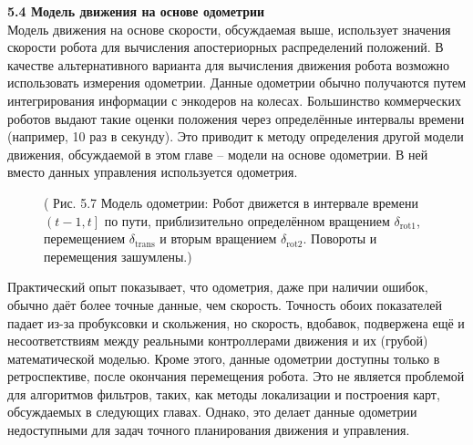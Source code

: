 \documentclass[10pt,a4paper]{article}
\begin{document}
\textbf{5.4 Модель движения на основе одометрии}\\

Модель движения на основе скорости, обсуждаемая выше, использует значения скорости робота для вычисления апостериорных распределений положений. В качестве альтернативного варианта для вычисления движения робота возможно использовать измерения одометрии. Данные одометрии обычно получаются путем интегрирования информации с энкодеров на колесах. Большинство коммерческих роботов выдают такие оценки положения через определённые интервалы времени (например, 10 раз в секунду). Это приводит к методу определения другой модели движения, обсуждаемой в этом главе – модели на основе одометрии. В ней вместо данных управления используется одометрия. 

\begin{figure}[H]
	\caption{ (  Рис. 5.7 Модель одометрии: Робот движется в интервале времени $\left( t - 1, t\right] $ по пути, приблизительно определённом вращением $\delta_{\text{rot}1}$, перемещением $\delta_{\text{trans}}$ и вторым вращением
	$\delta_{\text{rot}2}$. Повороты и перемещения зашумлены.)}
	\label{fig:57orig}
\end{figure}

Практический опыт показывает, что одометрия, даже при наличии ошибок, обычно даёт более точные данные, чем скорость. Точность обоих показателей падает из-за пробуксовки и скольжения, но скорость, вдобавок, подвержена ещё и несоответствиям между реальными контроллерами движения и их (грубой) математической моделью. Кроме этого, данные одометрии доступны только в ретроспективе, после окончания перемещения робота. Это не является проблемой для алгоритмов фильтров, таких, как методы локализации и построения карт, обсуждаемых в следующих главах. Однако, это делает данные одометрии недоступными для задач точного планирования движения и управления.\\
\end{document}
